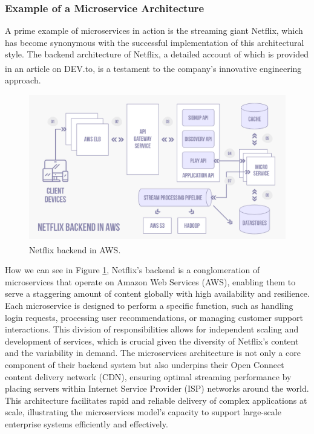 \subsubsection{Example of a Microservice Architecture}
A prime example of microservices in action is the streaming giant Netflix, which has become
synonymous with the successful implementation of this architectural style. The backend architecture
of Netflix, a detailed account of which is provided in an article on
DEV.to\textsuperscript{\cite{microservice_example}}, is a testament to the company's innovative
engineering approach.

\begin{figure}
    \centering
    \includegraphics[scale=0.25]{Pictures/3_netflix.png}
    \caption{Netflix backend in AWS\textsuperscript{\cite{microservice_example_image}}.}
    \label{fig:3_netflix}
\end{figure}

How we can see in Figure \ref{fig:3_netflix}, Netflix's backend is a conglomeration of microservices
that operate on Amazon Web Services (AWS), enabling them to serve a staggering amount of content
globally with high availability and resilience. Each microservice is designed to perform a specific
function, such as handling login requests, processing user recommendations, or managing customer
support interactions. This division of responsibilities allows for independent scaling and
development of services, which is crucial given the diversity of Netflix's content and the
variability in demand. The microservices architecture is not only a core component of their backend
system but also underpins their Open Connect content delivery network (CDN), ensuring optimal
streaming performance by placing servers within Internet Service Provider (ISP) networks around the
world. This architecture facilitates rapid and reliable delivery of complex applications at scale,
illustrating the microservices model's capacity to support large-scale enterprise systems
efficiently and effectively.

